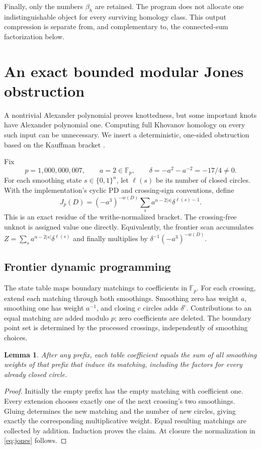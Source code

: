 \documentclass[11pt]{article}
\newtheorem{lemma}[theorem]{Lemma}
\theoremstyle{remark}\newtheorem{remark}[theorem]{Remark}
\newcommand{\F}{\mathbb F}
\begin{document}
Finally, only the numbers $\beta_h$ are retained. The program does not
allocate one indistinguishable object for every surviving homology class.
This output compression is separate from, and complementary to, the
connected-sum factorization below.

\section{An exact bounded modular Jones obstruction}\label{sec:jones}
A nontrivial Alexander polynomial proves knottedness, but some important
knots have Alexander polynomial one. Computing full Khovanov homology on
every such input can be unnecessary. We insert a deterministic,
one-sided obstruction based on the Kauffman bracket \cite{Kauffman}.

Fix
\[
 p=1{,}000{,}000{,}007,\qquad a=2\in\F_p,\qquad
 \delta=-a^2-a^{-2}=-17/4\ne0.
\]
For each smoothing state $s\in\{0,1\}^n$, let $\ell(s)$ be its number of
closed circles. With the implementation's cyclic PD and crossing-sign
conventions, define
\begin{equation}\label{eq:jones}
 J_p(D)=(-a^3)^{-w(D)}
          \sum_s a^{n-2|s|}\delta^{\ell(s)-1}.
\end{equation}
This is an exact residue of the writhe-normalized bracket. The crossing-free
unknot is assigned value one directly. Equivalently, the frontier scan
accumulates $Z=\sum_s a^{n-2|s|}\delta^{\ell(s)}$ and finally multiplies
by $\delta^{-1}(-a^3)^{-w(D)}$.

\subsection{Frontier dynamic programming}
The state table maps boundary matchings to coefficients in $\F_p$. For each
crossing, extend each matching through both smoothings. Smoothing zero has
weight $a$, smoothing one has weight $a^{-1}$, and closing $c$ circles adds
$\delta^c$. Contributions to an equal matching are added modulo $p$;
zero coefficients are deleted. The boundary point set is determined by
the processed crossings, independently of smoothing choices.

\begin{lemma}
After any prefix, each table coefficient equals the sum of all smoothing
weights of that prefix that induce its matching, including the factors
for every already closed circle.
\end{lemma}
\begin{proof}
Initially the empty prefix has the empty matching with coefficient one.
Every extension chooses exactly one of the next crossing's two smoothings.
Gluing determines the new matching and the number of new circles, giving
exactly the corresponding multiplicative weight. Equal resulting matchings
are collected by addition. Induction proves the claim. At closure the
normalization in \eqref{eq:jones} follows.
\end{proof}
\end{document}
